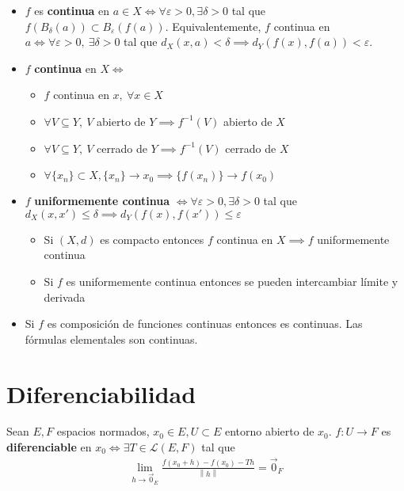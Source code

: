 \documentclass[a4paper,twocolumn]{extarticle}
\newcommand{\norma}[1]{\left\lVert#1\right\rVert}
\newcommand{\lacot}[1]{\mathcal{L}(#1)}
\begin{document}
\begin{itemize}
	\item $f$ es \textbf{continua} en $a \in X \iff \forall \varepsilon > 0, \exists \delta > 0$ tal que $f(B_\delta(a)) \subset B_\varepsilon(f(a))$. Equivalentemente, $f$ continua en $a \iff \forall \varepsilon > 0,\ \exists \delta > 0$ tal que $d_X(x, a) < \delta \implies d_Y(f(x), f(a)) < \varepsilon$.
	\item $f$ \textbf{continua} en $X \iff$
	\begin{itemize}
		\item $f$ continua en $x,\ \forall x \in X$
		\item $\forall V \subseteq Y,\ V$ abierto de $Y \implies f^{-1}(V)$ abierto de $X$
		\item $\forall V \subseteq Y,\ V$ cerrado de $Y \implies f^{-1}(V)$ cerrado de $X$
		\item $\forall \{x_n\} \subset X, \{x_n\} \to x_0 \implies \{f(x_n)\} \to f(x_0)$
	\end{itemize}
	
	\item $f$ \textbf{uniformemente continua} $\iff \forall \varepsilon > 0, \exists \delta > 0$ tal que $d_X(x, x') \leq \delta \implies d_Y(f(x), f(x')) \leq \varepsilon$
	\begin{itemize}
		\item Si $(X,d)$ es compacto entonces $f$ continua en $X \implies f$ uniformemente continua
		\item Si $f$ es uniformemente continua entonces se pueden intercambiar límite y derivada
	\end{itemize}
	\item Si $f$ es composición de funciones continuas entonces es continuas. Las fórmulas elementales son continuas.
\end{itemize}

\section{Diferenciabilidad}
Sean $E, F$ espacios normados, $x_0 \in E, U \subset E$ entorno abierto de $x_0$. $f:U \to F$ es \textbf{diferenciable} en $x_0 \iff \exists T \in \lacot{E, F}$ tal que
\begin{align*}
	\lim_{h \to \vec{0}_E} \frac{f(x_0 + h) - f(x_0) - Th}{\norma{h}} = \vec{0}_F
\end{align*}
\end{document}
